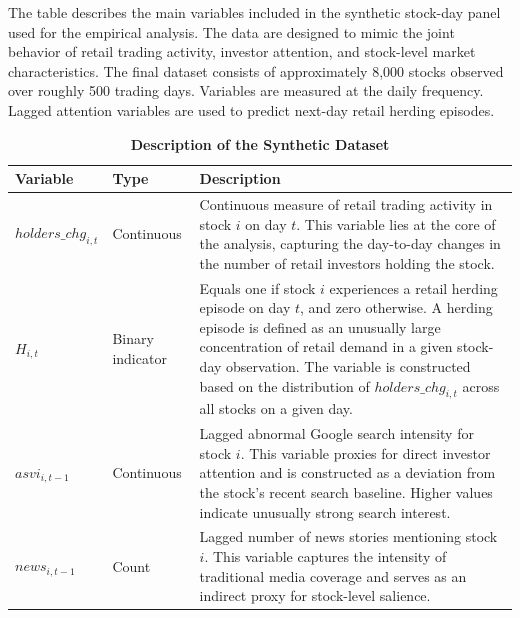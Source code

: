 \documentclass[12pt]{article}
\begin{document}
\begin{table}[htbp]
\centering
\caption[Description of the Synthetic Dataset]{\textbf{Description of the Synthetic Dataset}}
\label{tab:data_description}

\begin{threeparttable}
\begin{minipage}{\textwidth}
\footnotesize{
The table describes the main variables included in the synthetic stock-day panel used for the empirical analysis.
The data are designed to mimic the joint behavior of retail trading activity, investor attention, and stock-level market characteristics.
The final dataset consists of approximately 8{,}000 stocks observed over roughly 500 trading days.
Variables are measured at the daily frequency. Lagged attention variables are used to predict next-day retail herding episodes.}
\end{minipage}

\vspace{0.6em}

\footnotesize
\begin{tabularx}{\textwidth}{@{}l l X@{}}
\toprule
\textbf{Variable} & \textbf{Type} & \textbf{Description} \\
\midrule

$holders\_chg_{i,t}$ & Continuous & Continuous measure of retail trading activity in stock $i$ on day $t$. This variable lies at the core of the analysis, capturing the day-to-day changes in the number of retail investors holding the stock. \\

$H_{i,t}$ & Binary indicator & Equals one if stock $i$ experiences a retail herding episode on day $t$, and zero otherwise. A herding episode is defined as an unusually large concentration of retail demand in a given stock-day observation. The variable is constructed based on the distribution of $holders\_chg_{i,t}$ across all stocks on a given day. \\

$asvi_{i,t-1}$ & Continuous & Lagged abnormal Google search intensity for stock $i$. This variable proxies for direct investor attention and is constructed as a deviation from the stock's recent search baseline. Higher values indicate unusually strong search interest. \\

$news_{i,t-1}$ & Count & Lagged number of news stories mentioning stock $i$. This variable captures the intensity of traditional media coverage and serves as an indirect proxy for stock-level salience. \\


\end{tabularx}
\end{threeparttable}
\end{table}
\end{document}
